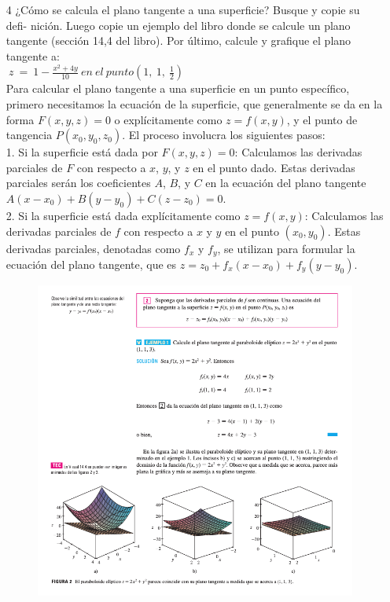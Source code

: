 \documentclass[13pt]{memoir}
\begin{document}
\begin{enumerate}
\clearpage 

\item[ 4] ¿Cómo se calcula el plano tangente a una superficie? Busque y copie su defi- nición. Luego copie un ejemplo del libro donde se calcule un plano tangente (sección 14,4 del libro). Por último, calcule y grafique el plano tangente a:\\ 

$\:z\:=\:1-\frac{x^2+4y}{10}\:en\:el\:punto\left(1,\:1,\:\frac{1}{2}\right)$\\ 

Para calcular el plano tangente a una superficie en un punto específico, primero necesitamos la ecuación de la superficie, que generalmente se da en la forma \(F(x, y, z) = 0\) o explícitamente como \(z = f(x, y)\), y el punto de tangencia \(P(x_0, y_0, z_0)\). El proceso involucra los siguientes pasos:\\ 

1. Si la superficie está dada por \(F(x, y, z) = 0\): Calculamos las derivadas parciales de \(F\) con respecto a \(x\), \(y\), y \(z\) en el punto dado. Estas derivadas parciales serán los coeficientes \(A\), \(B\), y \(C\) en la ecuación del plano tangente \(A(x - x_0) + B(y - y_0) + C(z - z_0) = 0\).\\ 

2. Si la superficie está dada explícitamente como \(z = f(x, y)\): Calculamos las derivadas parciales de \(f\) con respecto a \(x\) y \(y\) en el punto \((x_0, y_0)\). Estas derivadas parciales, denotadas como \(f_x\) y \(f_y\), se utilizan para formular la ecuación del plano tangente, que es \(z = z_0 + f_x(x - x_0) + f_y(y - y_0)\).\\ 

\begin{figure}[h]
    \centering
    \includegraphics[scale=0.6]{assets/t_2_6.png}  
\end{figure}


\end{enumerate}
\end{document}
